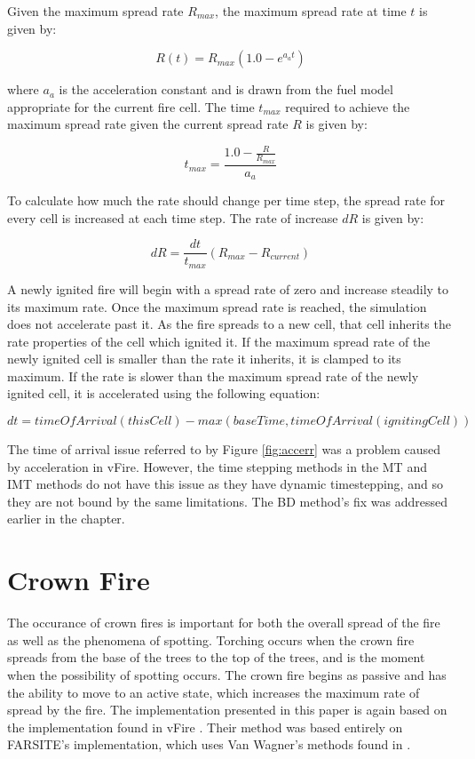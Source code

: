 Given the maximum spread rate $R_{max}$, the maximum spread rate at time $t$ is given by: 

\begin{equation}
R(t) = R_{max}(1.0 - e^{a_at})
\label{eq:R(t)}
\end{equation}

where $a_a$ is the acceleration constant and is drawn from the fuel model appropriate for the current fire cell. The time $t_{max}$ required to achieve the maximum spread rate given the current spread rate $R$ is given by: 

\begin{equation}
t_{max} = \frac{1.0 - \frac{R}{R_{max}}}{a_a}
\end{equation}

To calculate how much the rate should change per time step, the spread rate for every cell is increased at each time step. The rate of increase $dR$ is given by: 

\begin{equation}
dR = \frac{dt}{t_{max}}(R_{max} - R_{current})
\end{equation}

A newly ignited fire will begin with a spread rate of zero and increase steadily to its maximum rate. Once the maximum spread rate is reached, the simulation does not accelerate past it. As the fire spreads to a new cell, that cell inherits the rate properties of the cell which ignited it. If the maximum spread rate of the newly ignited cell is smaller than the rate it inherits, it is clamped to its maximum. If the rate is slower than the maximum spread rate of the newly ignited cell, it is accelerated using the following equation: 

\begin{equation}
dt = timeOfArrival(thisCell) - max(baseTime, timeOfArrival(ignitingCell))
\end{equation}

The time of arrival issue referred to by Figure \ref{fig:accerr} was a problem caused by acceleration in vFire. However, the time stepping methods in the MT and IMT methods do not have this issue as they have dynamic timestepping, and so they are not bound by the same limitations. The BD method's fix was addressed earlier in the chapter. 

\section{Crown Fire}
The occurance of crown fires is important for both the overall spread of the fire as well as the phenomena of spotting. Torching occurs when the crown fire spreads from the base of the trees to the top of the trees, and is the moment when the possibility of spotting occurs. The crown fire begins as passive and has the ability to move to an active state, which increases the maximum rate of spread by the fire. The implementation presented in this paper is again based on the implementation found in vFire \cite{vFire}. Their method was based entirely on FARSITE's implementation, which uses Van Wagner's methods found in \cite{wagner1977}\cite{wagner1993}. 

